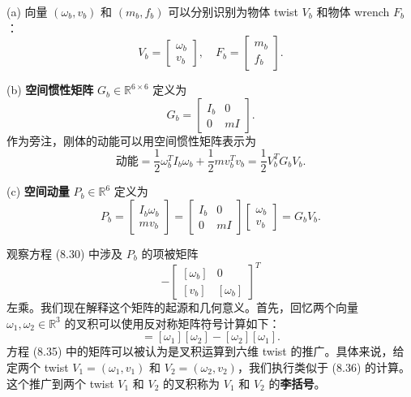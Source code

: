 \documentclass[12pt,a4paper]{article}
\begin{document}
(a) 向量 $(\omega_b, v_b)$ 和 $(m_b, f_b)$ 可以分别识别为物体 twist $V_b$ 和物体 wrench $F_b$：
\begin{equation}
V_b = \begin{bmatrix} \omega_b \\ v_b \end{bmatrix}, \quad F_b = \begin{bmatrix} m_b \\ f_b \end{bmatrix}. \label{eq:8.31}
\end{equation}

(b) \textbf{空间惯性矩阵} $G_b \in \mathbb{R}^{6 \times 6}$ 定义为
\begin{equation}
G_b = \begin{bmatrix} I_b & 0 \\ 0 & mI \end{bmatrix}. \label{eq:8.32}
\end{equation}
作为旁注，刚体的动能可以用空间惯性矩阵表示为
\begin{equation}
\text{动能} = \frac{1}{2}\omega_b^T I_b \omega_b + \frac{1}{2}mv_b^T v_b = \frac{1}{2}V_b^T G_b V_b. \label{eq:8.33}
\end{equation}

(c) \textbf{空间动量} $P_b \in \mathbb{R}^6$ 定义为
\begin{equation}
P_b = \begin{bmatrix} I_b \omega_b \\ mv_b \end{bmatrix} = \begin{bmatrix} I_b & 0 \\ 0 & mI \end{bmatrix}\begin{bmatrix} \omega_b \\ v_b \end{bmatrix} = G_b V_b. \label{eq:8.34}
\end{equation}

观察方程 (8.30) 中涉及 $P_b$ 的项被矩阵
\begin{equation}
-\begin{bmatrix} [\omega_b] & 0 \\ [v_b] & [\omega_b] \end{bmatrix}^T
\end{equation}
左乘。我们现在解释这个矩阵的起源和几何意义。首先，回忆两个向量 $\omega_1, \omega_2 \in \mathbb{R}^3$ 的叉积可以使用反对称矩阵符号计算如下：
\begin{equation}
[\omega_1 \times \omega_2] = [\omega_1][\omega_2] - [\omega_2][\omega_1]. \label{eq:8.36}
\end{equation}
方程 (8.35) 中的矩阵可以被认为是叉积运算到六维 twist 的推广。具体来说，给定两个 twist $V_1 = (\omega_1, v_1)$ 和 $V_2 = (\omega_2, v_2)$，我们执行类似于 (8.36) 的计算。这个推广到两个 twist $V_1$ 和 $V_2$ 的叉积称为 $V_1$ 和 $V_2$ 的\textbf{李括号}。
\end{document}
